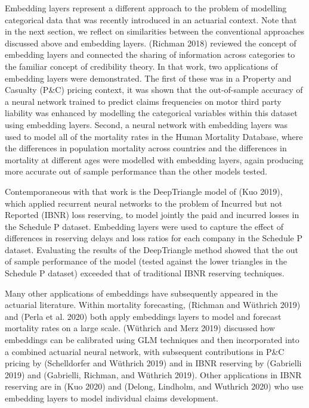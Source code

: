 \documentclass{article}
\begin{document}
Embedding layers represent a different approach to the problem of
modelling categorical data that was recently introduced in an actuarial
context. Note that in the next section, we reflect on similarities
between the conventional approaches discussed above and embedding
layers. (Richman 2018) reviewed the concept of embedding layers and
connected the sharing of information across categories to the familiar
concept of credibility theory. In that work, two applications of
embedding layers were demonstrated. The first of these was in a Property
and Casualty (P\&C) pricing context, it was shown that the out-of-sample
accuracy of a neural network trained to predict claims frequencies on
motor third party liability was enhanced by modelling the categorical
variables within this dataset using embedding layers. Second, a neural
network with embedding layers was used to model all of the mortality
rates in the Human Mortality Database, where the differences in
population mortality across countries and the differences in mortality
at different ages were modelled with embedding layers, again producing
more accurate out of sample performance than the other models tested.

Contemporaneous with that work is the DeepTriangle model of (Kuo 2019),
which applied recurrent neural networks to the problem of Incurred but
not Reported (IBNR) loss reserving, to model jointly the paid and
incurred losses in the Schedule P dataset. Embedding layers were used to
capture the effect of differences in reserving delays and loss ratios
for each company in the Schedule P dataset. Evaluating the results of
the DeepTriangle method showed that the out of sample performance of the
model (tested against the lower triangles in the Schedule P dataset)
exceeded that of traditional IBNR reserving techniques.

Many other applications of embeddings have subsequently appeared in the
actuarial literature. Within mortality forecasting, (Richman and
Wüthrich 2019) and (Perla et al. 2020) both apply embeddings layers to
model and forecast mortality rates on a large scale. (Wüthrich and Merz
2019) discussed how embeddings can be calibrated using GLM techniques
and then incorporated into a combined actuarial neural network, with
subsequent contributions in P\&C pricing by (Schelldorfer and Wüthrich
2019) and in IBNR reserving by (Gabrielli 2019) and (Gabrielli, Richman,
and Wüthrich 2019). Other applications in IBNR reserving are in (Kuo
2020) and (Delong, Lindholm, and Wuthrich 2020) who use embedding layers
to model individual claims development.
\end{document}
